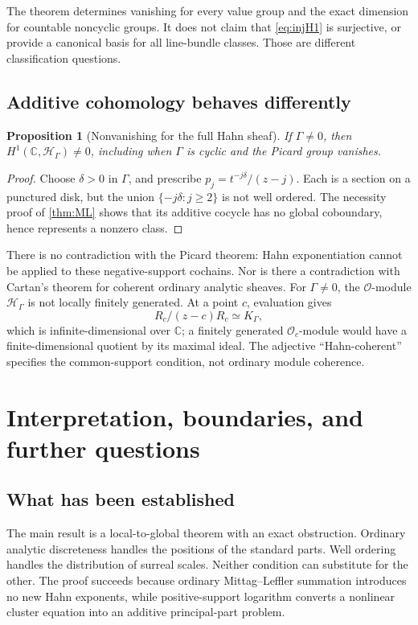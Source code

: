 \documentclass[11pt,letterpaper]{article}
\newtheorem{proposition}[proposition]{Proposition}
\theoremstyle{definition}
\theoremstyle{remark}
\newcommand{\C}{\mathbb C}
\newcommand{\OO}{\mathcal O}
\newcommand{\HH}{\mathscr H_\Gamma}
\newcommand{\KK}{K_\Gamma}
\numberwithin{equation}{section}
\begin{document}
The theorem determines vanishing for every value group and the exact dimension for countable noncyclic groups. It does not claim that \eqref{eq:injH1} is surjective, or provide a canonical basis for all line-bundle classes. Those are different classification questions.

\subsection{Additive cohomology behaves differently}
\begin{proposition}[Nonvanishing for the full Hahn sheaf]\label{prop:fullH1}
If $\Gamma\ne0$, then $H^1(\C,\HH)\ne0$, including when $\Gamma$ is cyclic and the Picard group vanishes.
\end{proposition}
\begin{proof}
Choose $\delta>0$ in $\Gamma$, and prescribe $p_j=t^{-j\delta}/(z-j)$. Each is a section on a punctured disk, but the union $\{-j\delta:j\ge2\}$ is not well ordered. The necessity proof of \cref{thm:ML} shows that its additive cocycle has no global coboundary, hence represents a nonzero class.
\end{proof}
There is no contradiction with the Picard theorem: Hahn exponentiation cannot be applied to these negative-support cochains. Nor is there a contradiction with Cartan's theorem for coherent ordinary analytic sheaves. For $\Gamma\ne0$, the $\OO$-module $\HH$ is not locally finitely generated. At a point $c$, evaluation gives
\[
 R_c/(z-c)R_c\simeq\KK,
\]
which is infinite-dimensional over $\C$; a finitely generated $\OO_c$-module would have a finite-dimensional quotient by its maximal ideal. The adjective ``Hahn-coherent'' specifies the common-support condition, not ordinary module coherence.

\section{Interpretation, boundaries, and further questions}\label{sec:scope}
\subsection{What has been established}
The main result is a local-to-global theorem with an exact obstruction. Ordinary analytic discreteness handles the positions of the standard parts. Well ordering handles the distribution of surreal scales. Neither condition can substitute for the other. The proof succeeds because ordinary Mittag--Leffler summation introduces no new Hahn exponents, while positive-support logarithm converts a nonlinear cluster equation into an additive principal-part problem.
\end{document}
